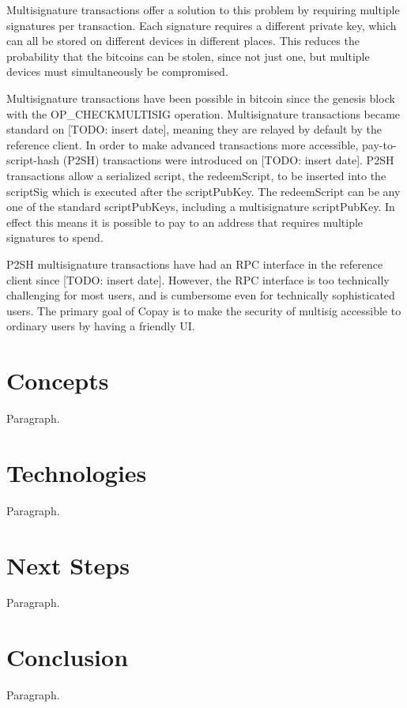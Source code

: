 \documentclass{article}
\begin{document}
Multisignature transactions offer a solution to this problem by requiring multiple signatures per transaction.
Each signature requires a different private key, which can all be stored on different devices in different places.
This reduces the probability that the bitcoins can be stolen, since not just one, but multiple devices must simultaneously be compromised.

Multisignature transactions have been possible in bitcoin since the genesis block with the OP\_CHECKMULTISIG operation. Multisignature transactions became standard on [TODO: insert date], meaning they are relayed by default by the reference client.
In order to make advanced transactions more accessible, pay-to-script-hash (P2SH) transactions were introduced on [TODO: insert date].
P2SH transactions allow a serialized script, the redeemScript, to be inserted into the scriptSig which is executed after the scriptPubKey.
The redeemScript can be any one of the standard scriptPubKeys, including a multisignature scriptPubKey.
In effect this means it is possible to pay to an address that requires multiple signatures to spend.

P2SH multisignature transactions have had an RPC interface in the reference client since [TODO: insert date].
However, the RPC interface is too technically challenging for most users, and is cumbersome even for technically sophisticated users.
The primary goal of Copay is to make the security of multisig accessible to ordinary users by having a friendly UI.


\section{Concepts}

Paragraph.

\section{Technologies}

Paragraph.

\section{Next Steps}

Paragraph.

\section{Conclusion}

Paragraph.
\end{document}
